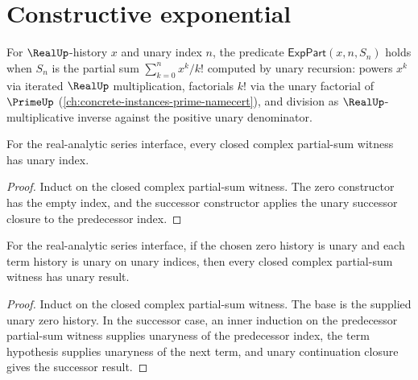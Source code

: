 \section{Constructive exponential}
\label{sec:real-analytic-exp}

\begin{definition}
\label{def:real-analytic-exp-part}
For \(\RealUp\)-history \(x\) and unary index \(n\), the predicate \(\mathsf{ExpPart}(x, n, S_n)\) holds when \(S_n\) is the partial sum \(\sum_{k=0}^{n} x^k / k!\) computed by unary recursion: powers \(x^k\) via iterated \(\RealUp\) multiplication, factorials \(k!\) via the unary factorial of \(\PrimeUp\) (\autoref{ch:concrete-instances-prime-namecert}), and division as \(\RealUp\)-multiplicative inverse against the positive unary denominator.
\end{definition}

\begin{lemma}
\label{lem:real-analytic-complex-part-sum-index-unary}
For the real-analytic series interface, every closed complex partial-sum
witness has unary index.
\end{lemma}
\begin{proof}
Induct on the closed complex partial-sum witness. The zero constructor has the
empty index, and the successor constructor applies the unary successor closure
to the predecessor index.
\end{proof}

\begin{theorem}
\label{thm:real-analytic-complex-part-sum-result-unary}
For the real-analytic series interface, if the chosen zero history is unary and
each term history is unary on unary indices, then every closed complex
partial-sum witness has unary result.
\end{theorem}
\begin{proof}
Induct on the closed complex partial-sum witness. The base is the supplied
unary zero history. In the successor case, an inner induction on the
predecessor partial-sum witness supplies unaryness of the predecessor index,
the term hypothesis supplies unaryness of the next term, and unary continuation
closure gives the successor result.
\end{proof}

